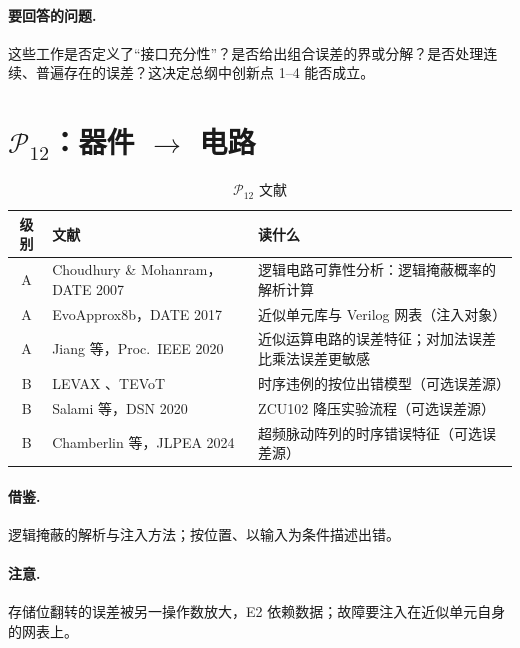 \documentclass[11pt,a4paper]{ctexart}
\begin{document}
\paragraph{要回答的问题.} 这些工作是否定义了“接口充分性”？是否给出组合误差的界或分解？是否处理连续、普遍存在的误差？这决定总纲中创新点 1--4 能否成立。

\section{$\mathcal P_{12}$：器件 $\to$ 电路}
\begin{table}[h]
\centering
\small
\begin{tabularx}{\textwidth}{@{}clX@{}}
\toprule
级别 & 文献 & 读什么 \\
\midrule
A & Choudhury \& Mohanram，DATE 2007 \cite{choudhury2007} & 逻辑电路可靠性分析：逻辑掩蔽概率的解析计算 \\
A & EvoApprox8b，DATE 2017 \cite{evoapprox} & 近似单元库与 Verilog 网表（注入对象） \\
A & Jiang 等，Proc.\ IEEE 2020 \cite{jiang2020} & 近似运算电路的误差特征；对加法误差比乘法误差更敏感 \\
B & LEVAX \cite{levax}、TEVoT \cite{tevot} & 时序违例的按位出错模型（可选误差源） \\
B & Salami 等，DSN 2020 \cite{salami2020} & ZCU102 降压实验流程（可选误差源） \\
B & Chamberlin 等，JLPEA 2024 \cite{chamberlin2024} & 超频脉动阵列的时序错误特征（可选误差源） \\
\bottomrule
\end{tabularx}
\caption{$\mathcal P_{12}$ 文献}
\end{table}

\paragraph{借鉴.} 逻辑掩蔽的解析与注入方法；按位置、以输入为条件描述出错。
\paragraph{注意.} 存储位翻转的误差被另一操作数放大，E2 依赖数据；故障要注入在近似单元自身的网表上。
\end{document}
